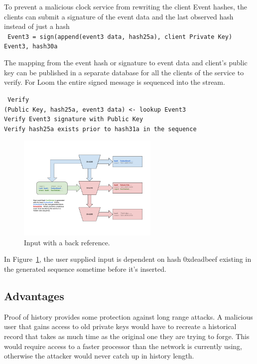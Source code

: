 \documentclass[12pt]{article}
\begin{document}
To prevent a malicious clock service from rewriting the client Event hashes, the clients can submit a signature of the event data and the last observed hash instead of just a hash\\
\texttt{
Event3 = sign(append(event3 data, hash25a), client Private Key)\\
Event3, hash30a\\
}

The mapping from the event hash or signature to event data and client’s public key can be published in a separate database for all the clients of the service to verify.  For Loom the entire signed message is sequenced into the stream.

\texttt{
Verify\\
    (Public Key, hash25a, event3 data) <- lookup Event3 \\
    Verify Event3 signature with Public Key\\
    Verify hash25a exists prior to hash31a in the sequence\\
}

\begin{figure}
  \begin{center}
    \centering
    \includegraphics[width=0.6\textwidth]{figures/fig_6.png}
    \caption[Fig 6]{Input with a back reference.\label{fig:poh_consistency}}
  \end{center}
  \end{figure}

In Figure~\ref{fig:poh_consistency}, the user supplied input is dependent on hash 0xdeadbeef existing in the generated sequence sometime before it’s inserted.
\subsection{Advantages}

Proof of history provides some protection against long range attacks.  A malicious user that gains access to old private keys would have to recreate a historical record that takes as much time as the original one they are trying to forge.  This would require access to a faster processor than the network is currently using, otherwise the attacker would never catch up in history length.
\end{document}
